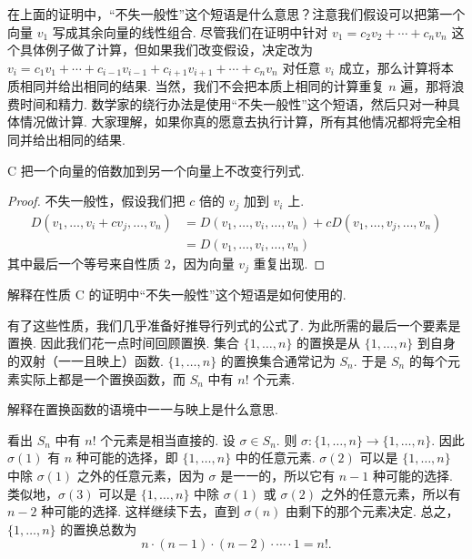 在上面的证明中，``不失一般性''这个短语是什么意思？注意我们假设可以把第一个向量 $v_1$ 写成其余向量的线性组合. 尽管我们在证明中针对 $v_1=c_2v_2+\cdots+c_nv_n$ 这个具体例子做了计算，但如果我们改变假设，决定改为 $v_i=c_1v_1+\cdots+c_{i-1}v_{i-1}+c_{i+1}v_{i+1}+\cdots+c_nv_n$ 对任意 $v_i$ 成立，那么计算将本质相同并给出相同的结果. 当然，我们不会把本质上相同的计算重复 $n$ 遍，那将浪费时间和精力. 数学家的绕行办法是使用``不失一般性''这个短语，然后只对一种具体情况做计算. 大家理解，如果你真的愿意去执行计算，所有其他情况都将完全相同并给出相同的结果.

\begin{property}{C}\label{prop:1-C}
把一个向量的倍数加到另一个向量上不改变行列式.
\end{property}

\begin{proof}
不失一般性，假设我们把 $c$ 倍的 $v_j$ 加到 $v_i$ 上.
\begin{align*}
D(v_1,\ldots,v_i+cv_j,\ldots,v_n)
&=D(v_1,\ldots,v_i,\ldots,v_n)+cD(v_1,\ldots,v_j,\ldots,v_n)\\
&=D(v_1,\ldots,v_i,\ldots,v_n)
\end{align*}
其中最后一个等号来自性质 2，因为向量 $v_j$ 重复出现.
\end{proof}

\begin{question}\label{q:1-13}
解释在性质 C 的证明中``不失一般性''这个短语是如何使用的.
\end{question}

有了这些性质，我们几乎准备好推导行列式的公式了. 为此所需的最后一个要素是置换. 因此我们花一点时间回顾置换. 集合 $\{1,\ldots,n\}$ 的置换是从 $\{1,\ldots,n\}$ 到自身的双射（一一且映上）函数. $\{1,\ldots,n\}$ 的置换集合通常记为 $S_n$. 于是 $S_n$ 的每个元素实际上都是一个置换函数，而 $S_n$ 中有 $n!$ 个元素.

\begin{question}\label{q:1-14}
解释在置换函数的语境中一一与映上是什么意思.
\end{question}

看出 $S_n$ 中有 $n!$ 个元素是相当直接的. 设 $\sigma\in S_n$. 则 $\sigma:\{1,\ldots,n\}\to\{1,\ldots,n\}$. 因此 $\sigma(1)$ 有 $n$ 种可能的选择，即 $\{1,\ldots,n\}$ 中的任意元素. $\sigma(2)$ 可以是 $\{1,\ldots,n\}$ 中除 $\sigma(1)$ 之外的任意元素，因为 $\sigma$ 是一一的，所以它有 $n-1$ 种可能的选择. 类似地，$\sigma(3)$ 可以是 $\{1,\ldots,n\}$ 中除 $\sigma(1)$ 或 $\sigma(2)$ 之外的任意元素，所以有 $n-2$ 种可能的选择. 这样继续下去，直到 $\sigma(n)$ 由剩下的那个元素决定. 总之，$\{1,\ldots,n\}$ 的置换总数为
\[
n\cdot(n-1)\cdot(n-2)\cdot\cdots\cdot1=n!.
\]

